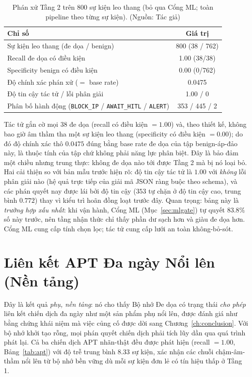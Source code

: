 \begin{table}[!htbp]
    \centering
    \caption{Phán xử Tầng 2 trên $800$ sự kiện leo thang (bỏ qua Cổng ML; toàn pipeline theo từng sự kiện). (Nguồn: Tác giả)}
    \label{tab:tier2adjudication}
    \begin{tabular}{|l|c|}
        \hline
        \textbf{Chỉ số} & \textbf{Giá trị} \\ \hline
        Sự kiện leo thang (đe dọa / benign) & 800 (38 / 762) \\ \hline
        Recall đe dọa có điều kiện & 1.00 (38/38) \\ \hline
        Specificity benign có điều kiện & 0.00 (0/762) \\ \hline
        Độ chính xác phán xử ($=$ base rate) & 0.0475 \\ \hline
        Độ tin cậy tác tử / lỗi phân giải & 1.00 / 0 \\ \hline
        Phân bố hành động (\texttt{BLOCK\_IP} / \texttt{AWAIT\_HITL} / \texttt{ALERT}) & 353 / 445 / 2 \\ \hline
    \end{tabular}
\end{table}

Tác tử gắn cờ mọi $38$ đe dọa (recall có điều kiện $=1.00$) và, theo thiết kế, không bao giờ âm thầm tha một sự kiện leo thang (specificity có điều kiện $=0.00$); do đó độ chính xác thô $0.0475$ đúng bằng base rate đe dọa của tập benign-áp-đảo này, là thuộc tính của tập chứ không phải năng lực phân biệt. Đây là bảo đảm một chiều nhưng trung thực: không đe dọa nào tới được Tầng 2 mà bị nó loại bỏ. Hai cải thiện so với bản mẫu trước hiện rõ: độ tin cậy tác tử là $1.00$ với \emph{không} lỗi phân giải nào (hệ quả trực tiếp của giải mã JSON ràng buộc theo schema), và các phán quyết nay được lái bởi độ tin cậy ($353$ tự chặn ở độ tin cậy cao, trung bình $0.772$) thay vì kiểu trì hoãn đồng loạt trước đây. Quan trọng: bảng này là \emph{trường hợp xấu nhất}: khi vận hành, Cổng ML (Mục~\ref{sec:mlgate}) tự quyết $83.8\%$ số này trước, nên tầng nhận thức chỉ thấy phần dư sạch hơn và giàu đe dọa hơn. Cổng ML cung cấp tính chọn lọc; tác tử cung cấp lưới an toàn không-bỏ-sót.

\section{Liên kết APT Đa ngày Nổi lên (Nền tảng)}
Đây là kết quả \emph{phụ, nền tảng}: nó cho thấy Bộ nhớ Đe dọa có trạng thái \emph{cho phép} liên kết chiến dịch đa ngày như một sản phẩm phụ nổi lên, được đánh giá như bằng chứng khái niệm mà việc củng cố được dời sang Chương~\ref{ch:conclusion}. Với bộ nhớ khởi tạo rỗng, mọi phán quyết chiến dịch phải tích lũy dần qua quá trình phát lại. Cả ba chiến dịch APT nhãn-thật đều được phát hiện (recall $=1.00$, Bảng~\ref{tab:apt}) với độ trễ trung bình $8.33$ sự kiện, xác nhận các chuỗi chậm-âm-thầm nổi lên từ bộ nhớ bền vững dù mỗi sự kiện đơn lẻ có tín hiệu thấp ở Tầng 1.

